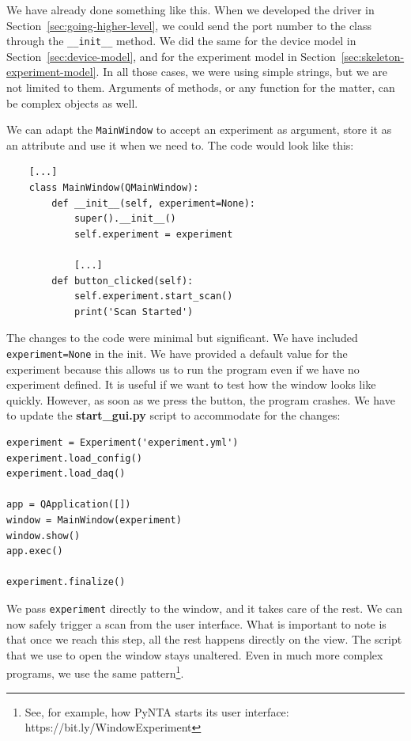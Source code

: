 We have already done something like this. When we developed the driver in Section~\ref{sec:going-higher-level}, we could send the port number to the class through the \texttt{\_\_init\_\_} method. We did the same for the device model in Section~\ref{sec:device-model}, and for the experiment model in Section~\ref{sec:skeleton-experiment-model}. In all those cases, we were using simple strings, but we are not limited to them. Arguments of methods, or any function for the matter, can be complex objects as well.

We can adapt the \texttt{MainWindow} to accept an experiment as argument, store it as an attribute and use it when we need to. The code would look like this:

\begin{verbatim}
    [...]
    class MainWindow(QMainWindow):
        def __init__(self, experiment=None):
            super().__init__()
            self.experiment = experiment

            [...]
        def button_clicked(self):
            self.experiment.start_scan()
            print('Scan Started')
\end{verbatim}

The changes to the code were minimal but significant. We have included \texttt{experiment=None} in the init. We have provided a default value for the experiment because this allows us to run the program even if we have no experiment defined. It is useful if we want to test how the window looks like quickly. However, as soon as we press the button, the program crashes. We have to update the \textbf{start\_gui.py} script to accommodate for the changes:

\begin{verbatim}
experiment = Experiment('experiment.yml')
experiment.load_config()
experiment.load_daq()

app = QApplication([])
window = MainWindow(experiment)
window.show()
app.exec()

experiment.finalize()
\end{verbatim}

We pass \texttt{experiment} directly to the window, and it takes care of the rest. We can now safely trigger a scan from the user interface. What is important to note is that once we reach this step, all the rest happens directly on the view. The script that we use to open the window stays unaltered. Even in much more complex programs, we use the same pattern\footnote{See, for example, how PyNTA starts its user interface: https://bit.ly/WindowExperiment}.

